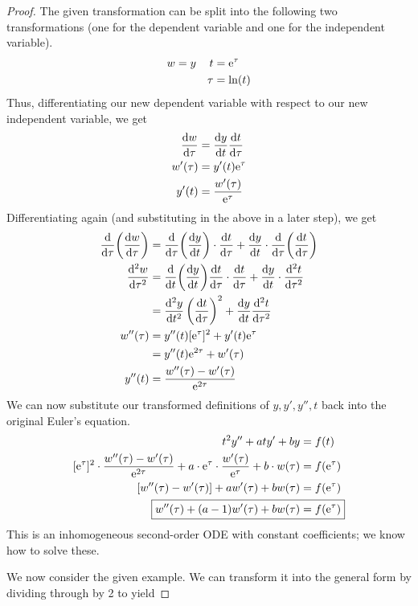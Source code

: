 \documentclass[../psets.tex]{subfiles}
\begin{document}
\begin{enumerate}
\begin{proof}
        The given transformation can be split into the following two transformations (one for the dependent variable and one for the independent variable).
        \begin{align*}
            w &= y&
                t &= \e[\tau]\\
            &&
                \tau &= \ln(t)
        \end{align*}
        Thus, differentiating our new dependent variable with respect to our new independent variable, we get
        \begin{align*}
            \dv{w}{\tau} &= \dv{y}{t}\dv{t}{\tau}\\
            w'(\tau) &= y'(t)\e[\tau]\\
            y'(t) &= \frac{w'(\tau)}{\e[\tau]}
        \end{align*}
        Differentiating again (and substituting in the above in a later step), we get
        \begin{align*}
            \dv{\tau}(\dv{w}{\tau}) &= \dv{\tau}(\dv{y}{t})\cdot\dv{t}{\tau}+\dv{y}{t}\cdot\dv{\tau}(\dv{t}{\tau})\\
            \dv[2]{w}{\tau} &= \dv{t}(\dv{y}{t})\dv{t}{\tau}\cdot\dv{t}{\tau}+\dv{y}{t}\cdot\dv[2]{t}{\tau}\\
            &= \dv[2]{y}{t}\left( \dv{t}{\tau} \right)^2+\dv{y}{t}\dv[2]{t}{\tau}\\
            w''(\tau) &= y''(t)[\e[\tau]]^2+y'(t)\e[\tau]\\
            &= y''(t)\e[2\tau]+w'(\tau)\\
            y''(t) &= \frac{w''(\tau)-w'(\tau)}{\e[2\tau]}
        \end{align*}
        We can now substitute our transformed definitions of $y,y',y'',t$ back into the original Euler's equation.
        \begin{align*}
            t^2y''+aty'+by &= f(t)\\
            [\e[\tau]]^2\cdot\frac{w''(\tau)-w'(\tau)}{\e[2\tau]}+a\cdot\e[\tau]\cdot\frac{w'(\tau)}{\e[\tau]}+b\cdot w(\tau) &= f(\e[\tau])\\
            [w''(\tau)-w'(\tau)]+aw'(\tau)+bw(\tau) &= f(\e[\tau])\\
            \Aboxed{w''(\tau)+(a-1)w'(\tau)+bw(\tau) &= f(\e[\tau])}
        \end{align*}
        This is an inhomogeneous second-order ODE with constant coefficients; we know how to solve these.\par
        We now consider the given example. We can transform it into the general form by dividing through by 2 to yield

\end{proof}
\end{enumerate}
\end{document}
